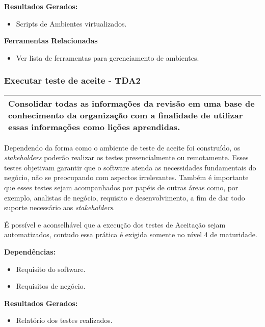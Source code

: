 \textbf{Resultados Gerados: }
\begin{itemize}
    \item  Scripts de Ambientes virtualizados.
\end{itemize}

\textbf{Ferramentas Relacionadas }
\begin{itemize}
    \item Ver lista de ferramentas para gerenciamento de ambientes. 
\end{itemize}

\subsubsection{Executar teste de aceite - TDA2}
\label{sec:tda2}

\begin{table}[!ht]
\centering
\begin{tabular}{|p{130mm}|}
\hline
Consolidar todas as informações da revisão em uma base de conhecimento da organização com a finalidade de utilizar essas informações como lições aprendidas. \\ 
\hline
\end{tabular}
\end{table}

Dependendo da forma como o ambiente de teste de aceite foi construído, os \textit{stakeholders} poderão realizar os testes presencialmente ou remotamente. Esses testes objetivam garantir que o software atenda as necessidades fundamentais do negócio, não se preocupando com aspectos irrelevantes. Também é importante que esses testes sejam acompanhados por papéis de outras áreas como, por exemplo, analistas de negócio, requisito e desenvolvimento, a fim de dar todo suporte necessário aos \textit{stakeholders}.

É possível e aconselhável que a execução dos testes de Aceitação sejam automatizados, contudo essa prática é exigida somente no nível 4 de maturidade.

\textbf{Dependências: }
\begin{itemize}
    \item Requisito do software.
    \item Requisitos de negócio.
\end{itemize}

\textbf{Resultados Gerados: }
\begin{itemize}
    \item Relatório dos testes realizados.  
\end{itemize}

